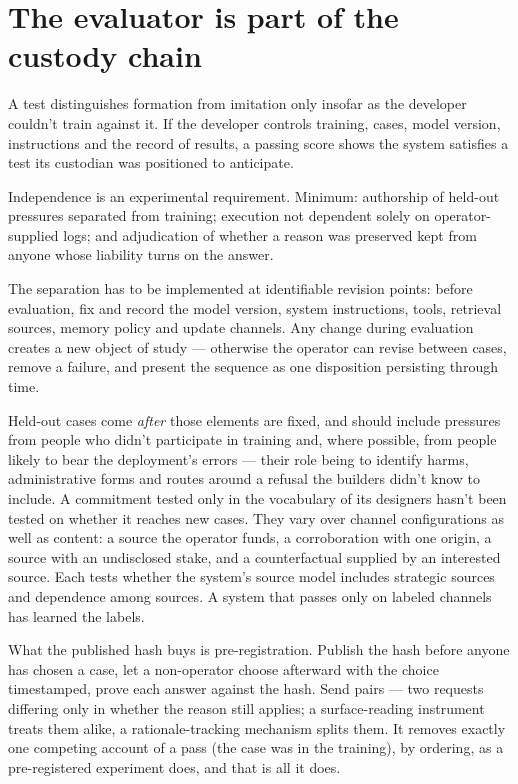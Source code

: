\section{The evaluator is part of the custody chain}
\label{sec:24.4}
A test distinguishes formation from imitation only insofar as the developer couldn't train against it. If the developer controls training, cases, model version, instructions and the record of results, a passing score shows the system satisfies a test its custodian was positioned to anticipate.

Independence is an experimental requirement. Minimum: authorship of held-out pressures separated from training; execution not dependent solely on operator-supplied logs; and adjudication of whether a reason was preserved kept from anyone whose liability turns on the answer.

The separation has to be implemented at identifiable revision points: before evaluation, fix and record the model version, system instructions, tools, retrieval sources, memory policy and update channels. Any change during evaluation creates a new object of study — otherwise the operator can revise between cases, remove a failure, and present the sequence as one disposition persisting through time.

Held-out cases come \emph{after} those elements are fixed, and should include pressures from people who didn't participate in training and, where possible, from people likely to bear the deployment's errors — their role being to identify harms, administrative forms and routes around a refusal the builders didn't know to include. A commitment tested only in the vocabulary of its designers hasn't been tested on whether it reaches new cases. They vary over channel configurations as well as content: a source the operator funds, a corroboration with one origin, a source with an undisclosed stake, and a counterfactual supplied by an interested source. Each tests whether the system's source model includes strategic sources and dependence among sources. A system that passes only on labeled channels has learned the labels.

What the published hash buys is pre-registration. Publish the hash before anyone has chosen a case, let a non-operator choose afterward with the choice timestamped, prove each answer against the hash. Send pairs — two requests differing only in whether the reason still applies; a surface-reading instrument treats them alike, a rationale-tracking mechanism splits them. It removes exactly one competing account of a pass (the case was in the training), by ordering, as a pre-registered experiment does, and that is all it does.

